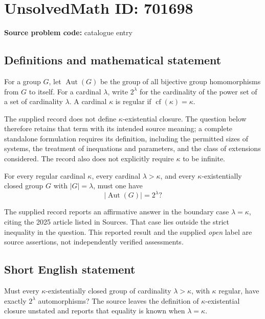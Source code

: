\documentclass[11pt]{article}
\begin{document}
\section*{UnsolvedMath ID: 701698}
\textbf{Source problem code:} catalogue entry
\subsection{Definitions and mathematical statement}
For a group \(G\), let \(\operatorname{Aut}(G)\) be the group of all bijective group homomorphisms from \(G\) to itself. For a cardinal \(\lambda\), write \(2^{\lambda}\) for the cardinality of the power set of a set of cardinality \(\lambda\). A cardinal \(\kappa\) is regular if \(\operatorname{cf}(\kappa)=\kappa\).

The supplied record does not define \(\kappa\)-existential closure. The question below therefore retains that term with its intended source meaning; a complete standalone formulation requires its definition, including the permitted sizes of systems, the treatment of inequations and parameters, and the class of extensions considered. The record also does not explicitly require \(\kappa\) to be infinite.

For every regular cardinal \(\kappa\), every cardinal \(\lambda>\kappa\), and every \(\kappa\)-existentially closed group \(G\) with \(|G|=\lambda\), must one have
\[
\bigl|\operatorname{Aut}(G)\bigr|=2^{\lambda}?
\]

The supplied record reports an affirmative answer in the boundary case \(\lambda=\kappa\), citing the 2025 article listed in Sources. That case lies outside the strict inequality in the question. This reported result and the supplied \emph{open} label are source assertions, not independently verified assessments.
\subsection{Short English statement}
Must every \(\kappa\)-existentially closed group of cardinality \(\lambda>\kappa\), with \(\kappa\) regular, have exactly \(2^{\lambda}\) automorphisms? The source leaves the definition of \(\kappa\)-existential closure unstated and reports that equality is known when \(\lambda=\kappa\).
\end{document}
